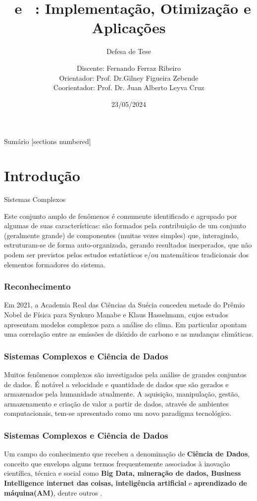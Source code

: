 \documentclass[11pt, aspectratio=169]{beamer}
\title{\pdcca~e \dmc~: Implementação, Otimização e Aplicações}
\subtitle{Defesa de Tese}
\date{23/05/2024}
\author{Discente: Fernando Ferraz Ribeiro \\Orientador: Prof. Dr.Gilney Figueira Zebende \\Coorientador: Prof. Dr. Juan Alberto Leyva Cruz}
\institute{PPGM UEFS - Feira de Santana, BA}
\begin{document}
\maketitle

\begin{frame}{Sumário}
  [sections numbered]
  \tableofcontents[hideallsubsections]
\end{frame}

\section{Introdução}

\begin{frame}[fragile]{Sistemas Complexos}

  Este conjunto amplo de fenômenos é comumente identificado e agrupado por algumas de suas características: são formados pela contribuição de um conjunto (geralmente grande) de componentes (muitas vezes simples) que, interagindo, estruturam-se de forma auto-organizada, gerando resultados inesperados, que não podem ser previstos pelos estudos estatísticos e/ou matemáticos tradicionais dos elementos formadores do sistema.

\end{frame}

\begin{frame}
  \frametitle{Reconhecimento}

  Em 2021, a Academia Real das Ciências da Suécia concedeu metade do Prêmio Nobel de Física para Syukuro Manabe e Klaus Hasselmann, cujos estudos apresentam modelos complexos para a análise do clima. Em particular apontam uma correlação entre as emissões de dióxido de carbono e as mudanças climáticas.

\end{frame}

\begin{frame}
  \frametitle{Sistemas Complexos e Ciência de Dados}

  Muitos fenômenos complexos são investigados pela análise de grandes conjuntos de dados. É notável a velocidade e quantidade de dados que são gerados e armazenados pela humanidade atualmente. A aquisição, manipulação, gestão, armazenamento e criação de valor a partir de dados, através de ambientes computacionais, tem-se apresentado como um novo paradigma tecnológico.

\end{frame}

\begin{frame}
  \frametitle{Sistemas Complexos e Ciência de Dados}
  Um campo do conhecimento que recebeu a denominação de \textbf{Ciência de Dados}, conceito que envelopa alguns termos frequentemente associados à inovação científica, técnica e social como \textbf{Big Data, mineração de dados, Business Intelligence internet das coisas, inteligência artificial} e \textbf{aprendizado de máquina(AM)}, dentre outros \cite[p. 12-13]{EMCdata2015}.
\end{frame}
\end{document}
